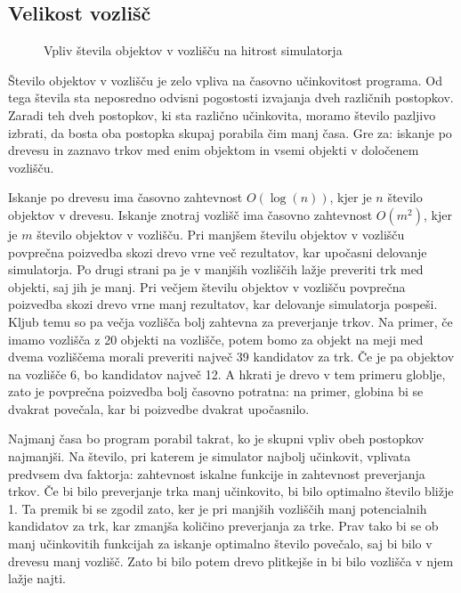 \documentclass[a4paper,12pt]{article}
\begin{document}
\subsection{Velikost vozlišč}

\begin{wrapfigure}{r}{0.5\textwidth}
    \caption{Vpliv števila objektov v vozlišču na hitrost simulatorja}
    \label{boxsizes_data}
\end{wrapfigure}

Število objektov v vozlišču je zelo vpliva na časovno učinkovitost programa. Od tega števila sta neposredno
odvisni pogostosti izvajanja dveh različnih postopkov. Zaradi teh dveh postopkov, ki sta različno učinkovita,
moramo število pazljivo izbrati, da bosta oba postopka skupaj porabila čim manj časa.
Gre za: iskanje po drevesu in zaznavo trkov med enim objektom in vsemi objekti v določenem vozlišču.

Iskanje po drevesu ima časovno zahtevnost $O(\log(n))$, kjer je $n$ število objektov v drevesu. Iskanje znotraj vozlišč
ima časovno zahtevnost $O(m^2)$, kjer je $m$ število objektov v vozlišču. Pri manjšem številu objektov v vozlišču
povprečna poizvedba skozi drevo vrne več rezultatov, kar upočasni delovanje simulatorja. Po drugi strani pa je v manjših
vozliščih lažje preveriti trk med objekti, saj jih je manj. Pri večjem številu objektov v vozlišču povprečna poizvedba 
skozi drevo vrne manj rezultatov, kar delovanje simulatorja pospeši. Kljub temu so pa večja vozlišča bolj zahtevna
za preverjanje trkov. Na primer, če imamo vozlišča z 20 objekti na vozlišče, potem bomo za objekt na meji med dvema
vozliščema morali preveriti največ 39 kandidatov za trk. Če je pa objektov na vozlišče 6, bo kandidatov največ 12.
A hkrati je drevo v tem primeru globlje, zato je povprečna poizvedba bolj časovno potratna: na primer, globina bi se dvakrat
povečala, kar bi poizvedbe dvakrat upočasnilo.

Najmanj časa bo program porabil takrat, ko je skupni vpliv obeh postopkov najmanjši. Na število, pri katerem
je simulator najbolj učinkovit, vplivata predvsem dva faktorja: zahtevnost iskalne funkcije in zahtevnost
preverjanja trkov. Če bi bilo preverjanje trka manj učinkovito, bi bilo optimalno število
bližje 1. Ta premik bi se zgodil zato, ker je pri manjših vozliščih manj potencialnih kandidatov za trk, kar
zmanjša količino preverjanja za trke. Prav tako bi se ob manj učinkovitih funkcijah za iskanje optimalno število povečalo, saj
bi bilo v drevesu manj vozlišč. Zato bi bilo potem drevo plitkejše in bi bilo vozlišča v njem lažje najti.
\end{document}
